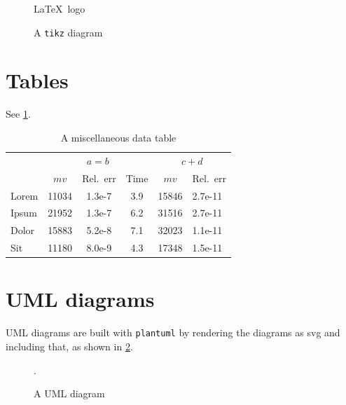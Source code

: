 \documentclass{baseline}
\begin{document}
\begin{figure}
    \centering
    
    \caption{\LaTeX\ logo}\label{fig:latex-logo}
\end{figure}

\begin{figure}
    \centering
    \caption{A \texttt{tikz} diagram}
\end{figure}

\section{Tables}

See \cref{table:misc}.

\begin{table}
\centering
\begin{tabular}{lccccl}\toprule
      & \multicolumn{3}{c}{\(a = b\)} & \multicolumn{2}{c}{\(c + d\)} \\
      \cmidrule(lr){2-4}\cmidrule(lr){5-6}
      & \(mv\)  & Rel.~err & Time    & \(mv\)  & Rel.~err \\\midrule
Lorem & 11034   & 1.3e-7   & 3.9     & 15846   & 2.7e-11  \\
Ipsum & 21952   & 1.3e-7   & 6.2     & 31516   & 2.7e-11  \\
Dolor & 15883   & 5.2e-8   & 7.1     & 32023   & 1.1e-11  \\
Sit   & 11180   & 8.0e-9   & 4.3     & 17348   & 1.5e-11  \\\bottomrule
\end{tabular}
\caption{A miscellaneous data table}
\label{table:misc}
\end{table}

\section{UML diagrams}

UML diagrams are built with \texttt{plantuml} by rendering the diagrams as svg
and including that, as shown in \cref{fig:uml}.

\begin{figure}
    \centering
    
    \caption{A UML diagram}\label{fig:uml}.
\end{figure}

\Blinddocument

\pagebreak

\printbibliography{}
\end{document}
